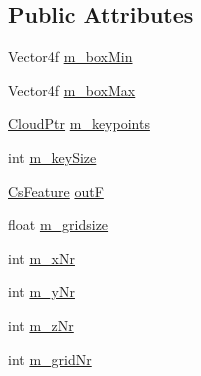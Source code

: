 \subsection*{\-Public \-Attributes}
\begin{DoxyCompactItemize}
\item 
\-Vector4f \hyperlink{class_cs_feature_estimation_a97a02375d6a8869f419db0444f6d7252}{m\-\_\-box\-Min}
\item 
\-Vector4f \hyperlink{class_cs_feature_estimation_ad9ed40ac0baf36fe5f1624883baca315}{m\-\_\-box\-Max}
\item 
\hyperlink{common_8h_a36884aa4a3c181fa4c284d79329ad166}{\-Cloud\-Ptr} \hyperlink{class_cs_feature_estimation_a7814bdaf2ec7ee028bb381e9e920fe85}{m\-\_\-keypoints}
\item 
int \hyperlink{class_cs_feature_estimation_a236193badf883b6eff1bbeb4868734a2}{m\-\_\-key\-Size}
\item 
\hyperlink{class_cs_feature}{\-Cs\-Feature} \hyperlink{class_cs_feature_estimation_ae23cbdd6bb125898febbc39c86fe6ed7}{out\-F}
\item 
float \hyperlink{class_cs_feature_estimation_acca08a432c066c2514d345cb9b5976b9}{m\-\_\-gridsize}
\item 
int \hyperlink{class_cs_feature_estimation_a594822f84ee39bbe6f16dad384459fea}{m\-\_\-x\-Nr}
\item 
int \hyperlink{class_cs_feature_estimation_a80110aa818455b337bcde0bbb3cf07be}{m\-\_\-y\-Nr}
\item 
int \hyperlink{class_cs_feature_estimation_a7f984e61208d61e119f78003b3cebd99}{m\-\_\-z\-Nr}
\item 
int \hyperlink{class_cs_feature_estimation_a1bd986e4871bb35f951274418e4dddaf}{m\-\_\-grid\-Nr}
\end{DoxyCompactItemize}



